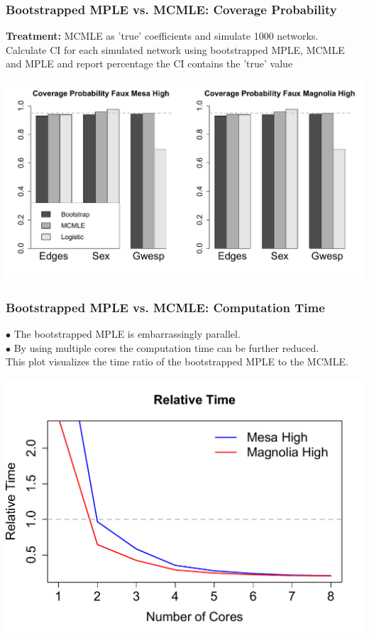 \documentclass[xcolor=dvipsnames]{beamer}
\begin{document}
\begin{frame}
\frametitle{Bootstrapped MPLE vs. MCMLE: Coverage Probability}
\textbf{Treatment:} MCMLE as 'true' coefficients and simulate 1000 networks.\\[0.1cm] 
Calculate CI for each simulated network using bootstrapped MPLE, MCMLE and MPLE and report percentage the CI contains the 'true' value
\begin{center}
\includegraphics[scale=.4]{Coverage_presentation} 
\end{center}

\end{frame}

\begin{frame}
\frametitle{Bootstrapped MPLE vs. MCMLE: Computation Time}

$\bullet$ The bootstrapped MPLE is embarrassingly parallel.\\[0.2cm]
$\bullet$ By using multiple cores the computation time can be further reduced.\\[0.2cm]
This plot visualizes the time ratio of the bootstrapped MPLE to the MCMLE. 

\begin{center}
\includegraphics[scale=.46]{relative_time_presentation} 
\end{center}

\end{frame}
\end{document}
